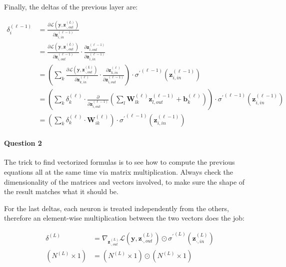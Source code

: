 \documentclass[
  a4paper,
]{article}
\begin{document}
Finally, the deltas of the previous layer are:

\begin{align}
\delta^{(\ell-1)}_i
&=\frac{
  \partial\mathcal{L}(\textbf{y},\textbf{z}^{(L)}_{\cdot,out})
}{
  \partial\mathbf{z}^{(\ell-1)}_{i,in}
} \\
&=\frac{
  \partial\mathcal{L}(\textbf{y},\textbf{z}^{(L)}_{\cdot,out})
}{
  \partial\mathbf{z}^{(\ell-1)}_{i,out}
}
\cdot\frac{
  \partial\mathbf{z}^{(\ell-1)}_{i,out}
}{
  \partial\mathbf{z}^{(\ell-1)}_{i,in}
} \\
&=\left(
  \sum_k\frac{
    \partial\mathcal{L}(\textbf{y},\textbf{z}^{(L)}_{\cdot,out})
  }{
    \partial\mathbf{z}^{(\ell)}_{k,in}
  }\cdot\frac{
    \partial\mathbf{z}^{(\ell)}_{k,in}
  }{
    \partial\mathbf{z}^{(\ell-1)}_{i,out}
  }
\right)
\cdot{\sigma^\prime}^{(\ell-1)}(\textbf{z}^{(\ell-1)}_{i,in}) \\
&=\left(
  \sum_k
  \delta^{(\ell)}_k
  \cdot\frac{
    \partial
  }{
    \partial\mathbf{z}^{(\ell-1)}_{i,out}
  }\left(
    \sum_l\textbf{W}^{(\ell)}_{lk}\textbf{z}^{(\ell-1)}_{l,out}+\textbf{b}^{(\ell)}_{k}
  \right)
\right)\cdot{\sigma^\prime}^{(\ell-1)}(\textbf{z}^{(\ell-1)}_{i,in}) \\
&=\left(
  \sum_k\delta^{(\ell)}_k\cdot\textbf{W}^{(\ell)}_{ik}
\right)\cdot{\sigma^\prime}^{(\ell-1)}(\textbf{z}^{(\ell-1)}_{i,in})
\end{align}

\hypertarget{question-2}{%
\paragraph{Question 2}\label{question-2}}

The trick to find vectorized formulas is to see how to compute the
previous equations all at the same time via matrix multiplication.
Always check the dimensionality of the matrices and vectors involved, to
make sure the shape of the result matches what it should be.

For the last deltas, each neuron is treated independently from the
others, therefore an element-wise multiplication between the two vectors
does the job:

\begin{equation}
\label{eq:lastdelta}
\begin{aligned}
\delta^{(L)}
&=\nabla_{\textbf{z}^{(L)}_{\cdot,out}}\mathcal{L}(\textbf{y},\textbf{z}^{(L)}_{\cdot,out})
\odot{\sigma^\prime}^{(L)}(\textbf{z}^{(L)}_{\cdot,in}) \\
(N^{(L)}\times 1) &= (N^{(L)}\times 1) \odot (N^{(L)}\times 1)
\end{aligned}
\end{equation}
\end{document}

